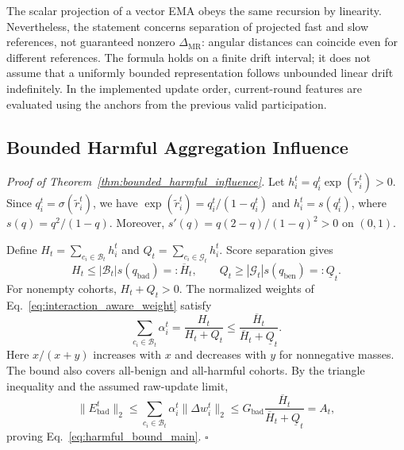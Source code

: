 \noindent The scalar projection of a vector EMA obeys the same recursion by linearity. Nevertheless, the statement concerns separation of projected fast and slow references, not guaranteed nonzero $\Delta_{\mathrm{MR}}$: angular distances can coincide even for different references. The formula holds on a finite drift interval; it does not assume that a uniformly bounded representation follows unbounded linear drift indefinitely. In the implemented update order, current-round features are evaluated using the anchors from the previous valid participation.

\subsection{Bounded Harmful Aggregation Influence}
\label{app:proof_harmful_influence}

\noindent\textit{Proof of Theorem~\ref{thm:bounded_harmful_influence}.} Let $h_i^t=q_i^t\exp(\widetilde r_i^t)>0$. Since $q_i^t=\sigma(\widetilde r_i^t)$, we have $\exp(\widetilde r_i^t)=q_i^t/(1-q_i^t)$ and $h_i^t=s(q_i^t)$, where $s(q)=q^2/(1-q)$. Moreover, $s'(q)=q(2-q)/(1-q)^2>0$ on $(0,1)$.

Define $H_t=\sum_{c_i\in\mathcal{B}_t}h_i^t$ and $Q_t=\sum_{c_i\in\mathcal{G}_t}h_i^t$. Score separation gives
\begin{equation}
H_t\leq |\mathcal{B}_t|s(q_{\mathrm{bad}})=:\overline H_t,\qquad Q_t\geq |\mathcal{G}_t|s(q_{\mathrm{ben}})=:\underline Q_t.
\label{eq:app_harmful_unnormalized_bounds}
\end{equation}
For nonempty cohorts, $H_t+Q_t>0$. The normalized weights of Eq.~\eqref{eq:interaction_aware_weight} satisfy
\begin{equation}
\sum_{c_i\in\mathcal{B}_t}\alpha_i^t=\frac{H_t}{H_t+Q_t}\leq\frac{\overline H_t}{\overline H_t+\underline Q_t}.
\label{eq:app_harmful_mass}
\end{equation}
Here $x/(x+y)$ increases with $x$ and decreases with $y$ for nonnegative masses. The bound also covers all-benign and all-harmful cohorts. By the triangle inequality and the assumed raw-update limit,
\begin{equation}
\|E_{\mathrm{bad}}^t\|_2\leq\sum_{c_i\in\mathcal{B}_t}\alpha_i^t\|\Delta w_i^t\|_2\leq G_{\mathrm{bad}}\frac{\overline H_t}{\overline H_t+\underline Q_t}=A_t,
\end{equation}
proving Eq.~\eqref{eq:harmful_bound_main}. \hfill$\square$

